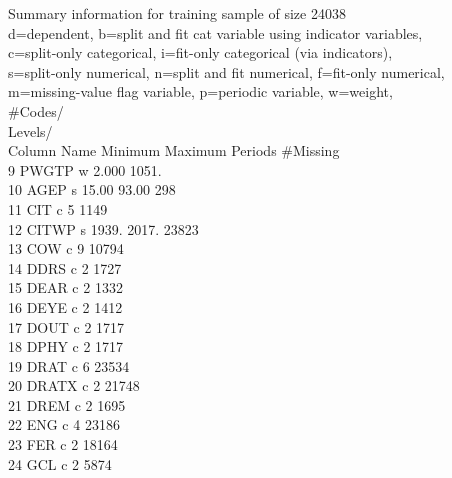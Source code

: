 \documentclass[12pt]{article}
\begin{document}
 Summary information for training sample of size 24038\\
 d=dependent, b=split and fit cat variable using indicator variables,\\
 c=split-only categorical, i=fit-only categorical (via indicators),\\
 s=split-only numerical, n=split and fit numerical, f=fit-only numerical,\\
 m=missing-value flag variable, p=periodic variable, w=weight,\\
                                                  \#Codes/           \\
                                                  Levels/           \\
  Column  Name            Minimum      Maximum    Periods   \#Missing\\
       9  PWGTP      w    2.000        1051.    \\
      10  AGEP       s    15.00        93.00                    298\\
      11  CIT        c                                  5      1149\\
      12  CITWP      s    1939.        2017.                  23823\\
      13  COW        c                                  9     10794\\
      14  DDRS       c                                  2      1727\\
      15  DEAR       c                                  2      1332\\
      16  DEYE       c                                  2      1412\\
      17  DOUT       c                                  2      1717\\
      18  DPHY       c                                  2      1717\\
      19  DRAT       c                                  6     23534\\
      20  DRATX      c                                  2     21748\\
      21  DREM       c                                  2      1695\\
      22  ENG        c                                  4     23186\\
      23  FER        c                                  2     18164\\
      24  GCL        c                                  2      5874\\
\end{document}
